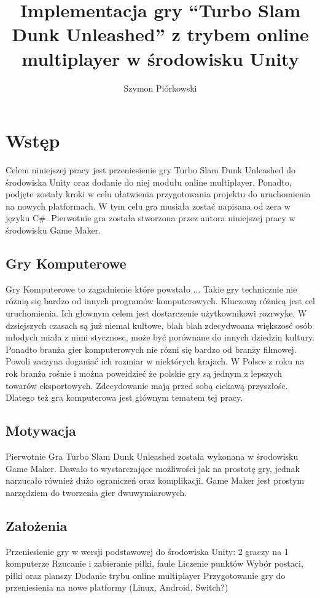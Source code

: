 \documentclass[a4paper,12pt,twoside,openany]{report}
\title{Implementacja gry “Turbo Slam Dunk Unleashed” z trybem online multiplayer w środowisku Unity}
\author{Szymon Piórkowski}
\begin{document}
\maketitle

\chapter{Wstęp}
Celem niniejszej pracy jest przeniesienie gry Turbo Slam Dunk Unleashed do środowiska Unity oraz dodanie do niej modułu online multiplayer. Ponadto, podjęte zostały kroki w celu ułatwienia przygotowania projektu do uruchomienia na nowych platformach. W tym celu gra musiała zostać napisana od zera w języku C\#. Pierwotnie gra została stworzona przez autora niniejszej pracy w środowisku Game Maker.

\section{Gry Komputerowe}
Gry Komputerowe to zagadnienie które powstało ... 
Takie gry technicznie nie różnią się bardzo od innych programów komputerowych. Kluczową różnicą jest cel uruchomienia. Ich głownym celem jest dostarczenie użytkownikowi rozrwyke. W dzsiejszych czasach są już niemal kultowe, blah blah zdecydwoana większosć osób młodych miała z nimi stycznosc, może być porównane do innych dziedzin kultury. Ponadto branża gier komputerowych nie rózni się bardzo od branży filmowej. Powoli zaczyna doganiać ich rozmiar w niektórych krajach. W Polsce z roku na rok branża rośnie i można poweidzieć że polskie gry są jednym z lepszych towarów eksportowych. Zdecydowanie mają przed sobą ciekawą przyszłośc. Dlatego też gra komputerowa jest głównym tematem tej pracy. 

\section{Motywacja}
Pierwotnie Gra Turbo Slam Dunk Unleashed została wykonana w środowisku Game Maker. Dawało to wystarczające możliwości jak na prostotę gry, jednak narzucało również dużo ograniczeń oraz komplikacji. Game Maker jest prostym narzędziem do tworzenia gier dwuwymiarowych.

\section{Założenia}

Przeniesienie gry w wersji podstawowej do środowiska Unity:
2 graczy na 1 komputerze
Rzucanie i zabieranie piłki, faule
Liczenie punktów
Wybór postaci, piłki oraz planszy
Dodanie trybu online multiplayer
Przygotowanie gry do przeniesienia na nowe platformy (Linux, Android, Switch?)
\end{document}

